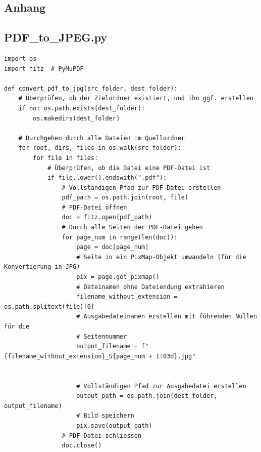 \documentclass[12pt, a4paper, ngerman, bidi=default]{article}
\begin{document}
\begin{description}
\begingroup
\small
\singlespacing
\printbibliography[
heading=bibintoc,
title={References}%
]
\endgroup

\newpage
\appendix
\section{Anhang}
\begingroup
\small
\subsection{PDF\_to\_JPEG.py}\label{section:PDF_to_JPEG}
\begin{verbatim}
import os
import fitz  # PyMuPDF

def convert_pdf_to_jpg(src_folder, dest_folder):
    # Überprüfen, ob der Zielordner existiert, und ihn ggf. erstellen
    if not os.path.exists(dest_folder):
        os.makedirs(dest_folder)

    # Durchgehen durch alle Dateien im Quellordner
    for root, dirs, files in os.walk(src_folder):
        for file in files:
            # Überprüfen, ob die Datei eine PDF-Datei ist
            if file.lower().endswith(".pdf"):
                # Vollständigen Pfad zur PDF-Datei erstellen
                pdf_path = os.path.join(root, file)
                # PDF-Datei öffnen
                doc = fitz.open(pdf_path)
                # Durch alle Seiten der PDF-Datei gehen
                for page_num in range(len(doc)):
                    page = doc[page_num]
                    # Seite in ein PixMap-Objekt umwandeln (für die Konvertierung in JPG)
                    pix = page.get_pixmap()
                    # Dateinamen ohne Dateiendung extrahieren
                    filename_without_extension = os.path.splitext(file)[0]
                    # Ausgabedateinamen erstellen mit führenden Nullen für die 
                    # Seitennummer
                    output_filename = f"{filename_without_extension}_S{page_num + 1:03d}.jpg"


                    # Vollständigen Pfad zur Ausgabedatei erstellen
                    output_path = os.path.join(dest_folder, output_filename)
                    # Bild speichern
                    pix.save(output_path)
                # PDF-Datei schliessen
                doc.close()
                

\end{verbatim}
\end{description}
\end{document}
